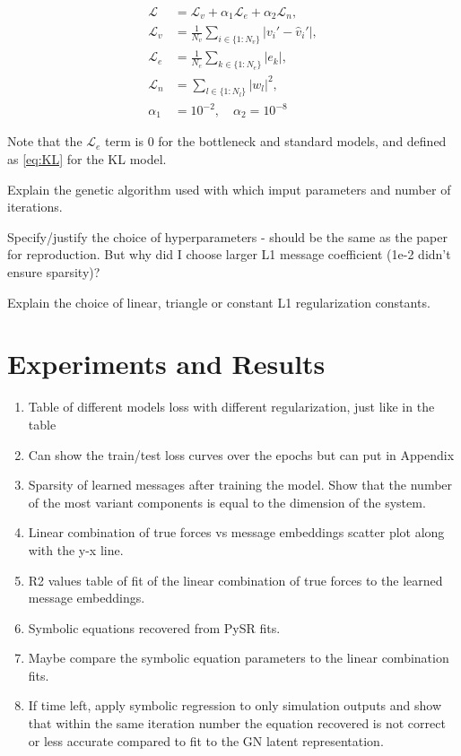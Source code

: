 \documentclass{article}
\begin{document}
\begin{equation}
\begin{aligned}
\mathcal{L} &= \mathcal{L}_v + \alpha_1 \mathcal{L}_e + \alpha_2 \mathcal{L}_n, \\
\mathcal{L}_v &= \frac{1}{N_v} \sum_{i \in \{1:N_v\}} \left| v_i' - \hat{v}_i' \right|, \\
\mathcal{L}_e &= \frac{1}{N_e} \sum_{k \in \{1:N_e\}} \left| e_k \right|, \\
\mathcal{L}_n &= \sum_{l \in \{1:N_l\}} \left| w_l \right|^2, \\
\alpha_1 &= 10^{-2}, \quad \alpha_2 = 10^{-8}
\end{aligned}
\end{equation}



Note that the $\mathcal{L}_e$ term is $0$ for the bottleneck and standard models, and defined as \ref{eq:KL} for the KL model.

Explain the genetic algorithm used with which imput parameters and number of iterations.

Specify/justify the choice of hyperparameters - should be the same as the paper for reproduction. But why did I choose larger L1 message coefficient (1e-2 didn't ensure sparsity)?

Explain the choice of linear, triangle or constant L1 regularization constants. 


\section{Experiments and Results}

\begin{enumerate}
    \item Table of different models loss with different regularization, just like in the table
    \item Can show the train/test loss curves over the epochs but can put in Appendix
    \item Sparsity of learned messages after training the model. Show that the number of the most variant components is equal to the dimension of the system.
    \item Linear combination of true forces vs message embeddings scatter plot along with the y-x line.
    \item R2 values table of fit of the linear combination of true forces to the learned message embeddings.
    \item Symbolic equations recovered from PySR fits.
    \item Maybe compare the symbolic equation parameters to the linear combination fits.
    \item If time left, apply symbolic regression to only simulation outputs and show that within the same iteration number the equation recovered is not correct or less accurate compared to fit to the GN latent representation.
\end{enumerate}
\end{document}
